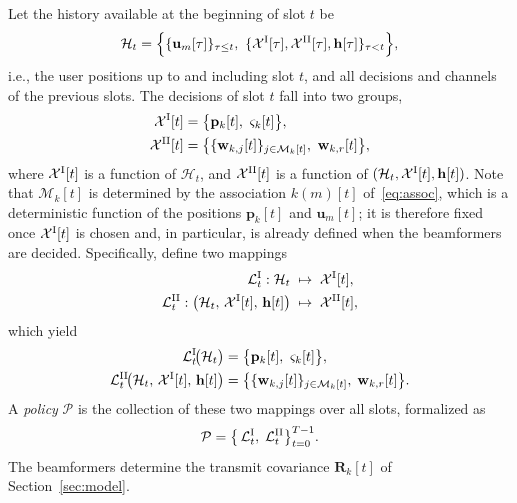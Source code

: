 \documentclass[conference]{IEEEtran}
\begin{document}
Let the history available at the beginning of slot $t$ be
\begin{equation}
\mathcal H_t=\Big\{\{\mathbf u_m[\tau]\}_{\tau\le t},\ \{\mathcal X^{\rm I}[\tau],\mathcal X^{\rm II}[\tau],\mathbf h[\tau]\}_{\tau<t}\Big\},
\end{equation}
i.e., the user positions up to and including slot $t$, and all decisions and channels of the previous slots. The decisions of slot $t$ fall into two groups,
\begin{align}
\mathcal X^{\rm I}[t] &= \big\{\mathbf p_k[t],\ \varsigma_k[t]\big\}, \\
\mathcal X^{\rm II}[t] &= \big\{\{\mathbf w_{k,j}[t]\}_{j\in\mathcal M_k[t]},\ \mathbf w_{k,r}[t]\big\},
\end{align}
where $\mathcal X^{\rm I}[t]$ is a function of $\mathcal H_t$, and $\mathcal X^{\rm II}[t]$ is a function of $(\mathcal H_t,\mathcal X^{\rm I}[t],\mathbf h[t])$. Note that $\mathcal M_k[t]$ is determined by the association $k(m)[t]$ of~\eqref{eq:assoc}, which is a deterministic function of the positions $\mathbf p_k[t]$ and $\mathbf u_m[t]$; it is therefore fixed once $\mathcal X^{\rm I}[t]$ is chosen and, in particular, is already defined when the beamformers are decided. Specifically, define two mappings
\begin{align}
    \mathcal{L}^{\rm I}_t : \mathcal H_t &\;\mapsto\; \mathcal X^{\rm I}[t], \\
    \mathcal{L}^{\rm II}_t : \big(\mathcal H_t,\,\mathcal X^{\rm I}[t],\,\mathbf h[t]\big) &\;\mapsto\; \mathcal X^{\rm II}[t],
\end{align}
which yield
\begin{align}
    \mathcal{L}^{\rm I}_t\!\big(\mathcal H_t\big) &= \big\{\mathbf p_k[t],\ \varsigma_k[t]\big\}, \\
    \mathcal{L}^{\rm II}_t\!\big(\mathcal H_t,\,\mathcal X^{\rm I}[t],\,\mathbf h[t]\big) &= \big\{\{\mathbf w_{k,j}[t]\}_{j\in\mathcal M_k[t]},\;\mathbf w_{k,r}[t]\big\}.
\end{align}
A \emph{policy} $\mathcal P$ is the collection of these two mappings over all slots, formalized as
\begin{equation}\label{eq:policy}
    \mathcal P = \big\{\,\mathcal{L}^{\rm I}_t,\;\mathcal{L}^{\rm II}_t\big\}_{t=0}^{T-1}.
\end{equation}
The beamformers determine the transmit covariance $\mathbf R_k[t]$ of Section~\ref{sec:model}.
\end{document}
